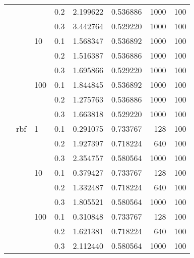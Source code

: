 \begin{table}[H]
\begin{tabular}{llllrrrr}
           &     &     & 0.2 &  2.199622 &  0.536886 &    1000 &   100 \\
           &     &     & 0.3 &  3.442764 &  0.529220 &    1000 &   100 \\
           &     & 10  & 0.1 &  1.568347 &  0.536892 &    1000 &   100 \\
           &     &     & 0.2 &  1.516387 &  0.536886 &    1000 &   100 \\
           &     &     & 0.3 &  1.695866 &  0.529220 &    1000 &   100 \\
           &     & 100 & 0.1 &  1.844845 &  0.536892 &    1000 &   100 \\
           &     &     & 0.2 &  1.275763 &  0.536886 &    1000 &   100 \\
           &     &     & 0.3 &  1.663818 &  0.529220 &    1000 &   100 \\
           & rbf & 1   & 0.1 &  0.291075 &  0.733767 &     128 &   100 \\
           &     &     & 0.2 &  1.927397 &  0.718224 &     640 &   100 \\
           &     &     & 0.3 &  2.354757 &  0.580564 &    1000 &   100 \\
           &     & 10  & 0.1 &  0.379427 &  0.733767 &     128 &   100 \\
           &     &     & 0.2 &  1.332487 &  0.718224 &     640 &   100 \\
           &     &     & 0.3 &  1.805521 &  0.580564 &    1000 &   100 \\
           &     & 100 & 0.1 &  0.310848 &  0.733767 &     128 &   100 \\
           &     &     & 0.2 &  1.621381 &  0.718224 &     640 &   100 \\
           &     &     & 0.3 &  2.112440 &  0.580564 &    1000 &   100 \\
\bottomrule
\end{tabular}
\end{table}
